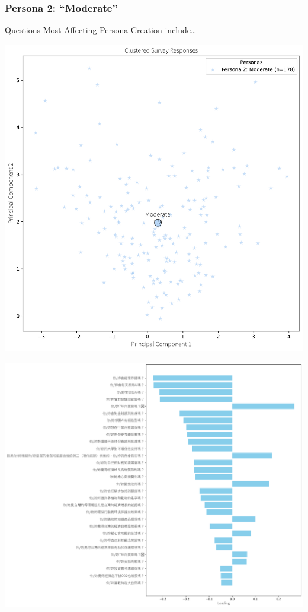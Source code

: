 \documentclass[
  letterpaper,
  DIV=11,
  numbers=noendperiod]{scrartcl}
\begin{document}
\subsubsection{Persona 2: ``Moderate''}\label{persona-2-moderate}

Questions Most Affecting Persona Creation include\ldots{}

\includegraphics{_thesis_files/figure-pdf/cell-26-output-1.pdf}

\includegraphics{_thesis_files/figure-pdf/cell-26-output-2.pdf}
\end{document}
